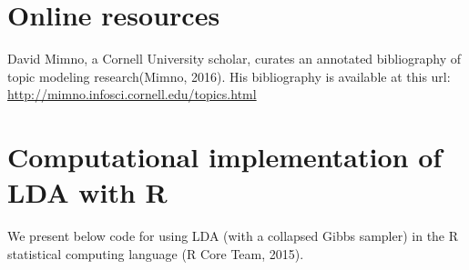 \documentclass[12pt,]{article}
\begin{document}
\section{Online resources}\label{online-resources}

David Mimno, a Cornell University scholar, curates an annotated
bibliography of topic modeling research(Mimno, 2016). His bibliography
is available at this url:
\url{http://mimno.infosci.cornell.edu/topics.html}

\section{Computational implementation of LDA with
R}\label{computational-implementation-of-lda-with-r}

We present below code for using LDA (with a collapsed Gibbs sampler) in
the R statistical computing language (R Core Team, 2015).
\end{document}
